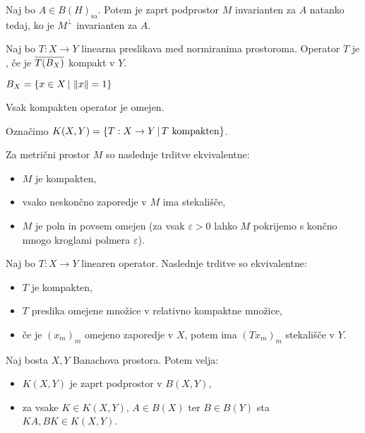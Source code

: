 \begin{posledica}
  Naj bo $A \in B(H)_{\text{sa}}$.
  Potem je zaprt podprostor $M$ invarianten za $A$ natanko tedaj, ko je $M^\bot$
  invarianten za $A$.
\end{posledica}


\begin{definicija}
  Naj bo $T: X \to Y$ linearna preslikava med normiranima prostoroma.
  Operator $T$ je , če je $\overline{T(B_X)}$ kompakt v $Y$.
\end{definicija}

\begin{opomba}
  $B_X = \{ x \in X \,|\, \left\lVert x\right\rVert = 1 \}$
\end{opomba}

\begin{opomba}
  Vsak kompakten operator je omejen.
\end{opomba}

Označimo $K(X,Y) = \{ T: X \to Y \,|\, \text{$T$ kompakten} \}$.

\begin{izrek}
  Za metrični prostor $M$ so naslednje trditve ekvivalentne:
  \begin{itemize}
  \item $M$ je kompakten,
  \item vsako neskončno zaporedje v $M$ ima stekališče,
  \item $M$ je poln in povsem omejen (za vsak $\varepsilon > 0$ lahko $M$
	pokrijemo s končno mnogo kroglami polmera $\varepsilon$).
  \end{itemize}
\end{izrek}

\begin{izrek}
  Naj bo $T: X \to Y$ linearen operator.
  Naslednje trditve so ekvivalentne:
  \begin{itemize}
  \item $T$ je kompakten,
  \item $T$ preslika omejene množice v relativno kompaktne množice,
  \item če je $(x_m)_m$ omejeno zaporedje v $X$, potem ima $(Tx_m)_m$ stekališče
	v $Y$.
  \end{itemize}
\end{izrek}

\begin{trditev}
  Naj bosta $X, Y$ Banachova prostora.
  Potem velja:
  \begin{itemize}
  \item $K(X,Y)$ je zaprt podprostor v $B(X,Y)$,
  \item za vsake $K \in K(X,Y)$, $A \in B(X)$ ter $B \in B(Y)$ sta $KA, BK \in
	K(X,Y)$.
  \end{itemize}
\end{trditev}

